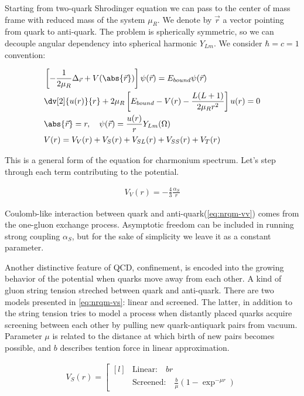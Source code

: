 Starting from two-quark Shrodinger equation we can pass to the center of mass frame with reduced mass of the system $\mu_R$. We denote by $\vec{r}$ a vector pointing from quark to anti-quark. The problem is spherically symmetric, so we can decouple angular dependency into spherical harmonic $Y_{Lm}$. We consider $\hbar = c = 1$ convention:

\begin{align}
    &\left[ -\frac{1}{2 \mu_R} \Delta_{\vec{r}} + V(\abs{\vec{r}}) \right] \psi(\vec{r}) = E_{bound} \psi(\vec{r}) \\
    &\dv[2]{u(r)}{r} + 2 \mu_R \left[ E_{bound} - V(r) - \frac{L(L+1)}{2 \mu_R r^2} \right] u(r) = 0 \label{eq:nrqm-radialeq} \\
    &\abs{\vec{r}} = r ,\quad \psi(\vec{r}) = \frac{u(r)}{r} Y_{Lm}(\Omega) \\
    &V(r) = V_V(r) +V_S(r) + V_{SL}(r) + V_{SS}(r) + V_T(r)
\end{align}

This is a general form of the equation for charmonium spectrum. Let's step through each term contributing to the potential.

\begin{align} \label{eq:nrqm-vv}
    V_V(r) = -\frac{4}{3} \frac{\alpha_S}{r}
\end{align}

Coulomb-like interaction between quark and anti-quark(\cref{eq:nrqm-vv}) comes from the one-gluon exchange process. Asymptotic freedom can be included in running strong coupling $\alpha_S$, but for the sake of simplicity we leave it as a constant parameter.

Another distinctive feature of QCD, confinement, is encoded into the growing behavior of the potential when quarks move away from each other. A kind of gluon string tension streched between quark and anti-quark. There are two models presented in \cref{eq:nrqm-vs}: linear and screened. The latter, in addition to the string tension tries to model a process when distantly placed quarks acquire screening between each other by pulling new quark-antiquark pairs from vacuum. Parameter $\mu$ is related to the distance at which birth of new pairs becomes possible, and $b$ describes tention force in linear approximation.

\begin{align} \label{eq:nrqm-vs}
    V_S(r) = \left[ \begin{matrix*}[l]
                    &\text{Linear:}\quad br \\
                    &\text{Screened:}\quad \frac{b}{\mu} (1 - \exp^{-\mu r})
              \end{matrix*} \right.
\end{align}

